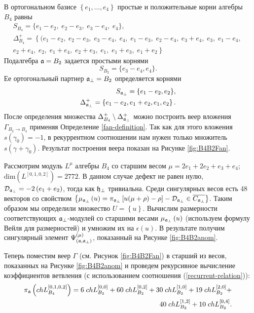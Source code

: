 В ортогональном базисе $\left\{e_1,\dots,e_4\right\}$ простые и положительные корни алгебры $B_4$ равны
\begin{eqnarray*}
  \label{eq:19}
  S_{B_4}= \{e_1 - e_2,\; e_2 - e_3,\; e_3 - e_4,\; e_4\},\\[2mm]
 \Delta^+_{B_4}=\left\{ (e_1 - e_2,\; e_2 - e_3,\; e_3 - e_4,\; e_4,\; e_1 - e_3,\; e_2 - e_4,\; e_3 + e_4,\; e_3,\; e_1 - e_4,\;\right.\\
 \left. e_2 + e_4,\; e_2,\; e_1 + e_4,\; e_2 + e_3,\; e_1,\; e_1 + e_3,\; e_1 + e_2\right\}
\end{eqnarray*}
Подалгебра  $\mathfrak{a}=B_2$ задается простыми корнями
\begin{equation*}
  \label{eq:155}
 S_{B_2}=\{e_3-e_4,e_4\}.
\end{equation*}
Ее ортогональный партнер $\mathfrak{a}_{\perp}=B_2$ определяется корнями
\begin{eqnarray*}
  \label{eq:27}
  S_{\mathfrak{a}_{\perp}}=\{e_1-e_2,e_2\},\\
 \Delta^{+}_{\mathfrak{a}_{\perp}}= \left\{e_1-e_2,e_1+e_2,e_1,e_2\right\}.
\end{eqnarray*}
После определения множества $\Delta^+_{B_4} \setminus  \Delta^{+}_{\mathfrak{a}_{\perp}}$ можно построить веер вложения $\Gamma_{B_2 \to B_4}$ применяя Определение \ref{fan-definition}. Так как для этого вложения $s\left( \gamma_0\right)=-1$, в рекуррентном соотношении нам нужен только множитель $s\left(\gamma + \gamma_0\right)$. Результат построения веера показан на Рисунке \ref{fig:B4B2Fan}.

Рассмотрим модуль $L^{\mu}$ алгебры  $B_4$ со старшим весом $\mu=2e_1 + 2 e_2 + e_3 + e_4$; \,
$\mathrm{dim}(L^{\left[0,1,0,2\right]})=2772$.
В данном случае дефект не равен нулю, $\mathcal{D}_{\mathfrak{a}_{\perp }}=-2\left( e_1 + e_2 \right)$, тогда как $\mathfrak{h}_{\bot}$ тривиальна. Среди сингулярных весов есть 
48 векторов со свойством $\left\{ \mu _{\mathfrak{a}_{\perp}}\left( u\right) =\pi _{\mathfrak{a}_{\perp }}\left[ u(\mu +\rho)-\rho \right] -\mathcal{D}_{\mathfrak{a}_{\perp}}\in \overline{C_{\mathfrak{a}_{\perp}}}\right\} $.
Таким образом мы определили множество $U=\left\{ u \right\}$. Вычислим размерности соответствующих  $\mathfrak{a}_{\perp}$-модулей со старшими весами $\mu_{\mathfrak{a}_{\perp}}\left( u\right)$ (используем формулу Вейля для размерностей) и умножим их на $\epsilon\left( u \right)$. В результате получим сингулярный элемент
$\Psi ^{\left( \mu \right) }_{\left(  \mathfrak{a}, \mathfrak{a}_{\perp} \right)}$, показанный на Рисунке \ref{fig:B4B2anom}.

Теперь поместим веер  $\Gamma$ (см. Рисунок \ref{fig:B4B2Fan}) в старший из весов, показанных на Рисунке \ref{fig:B4B2anom} и проведем рекурсивное вычисление коэффициентов ветвления (с использованием соотношения (\ref{recurrent-relation})):
\begin{eqnarray*}
  \label{eq:24}
  \pi_{\mathfrak{a}} \left(ch L^{\left[0,1,0,2\right]}_{B_4}\right) = 6 \; ch L^{\left[0,0\right]}_{B_2}+ 60
  \; ch L_{B_2}^{\left[0,2\right]}+ 30 \; ch L_{B_2}^{\left[1,0\right]}+ 19 \; ch L_{B_2}^{\left[2,0\right]}+\\
  40 \; ch L_{B_2}^{\left[1,2\right]}+ 10 \; ch L_{B_2}^{\left[0,4\right]}.
\end{eqnarray*}

